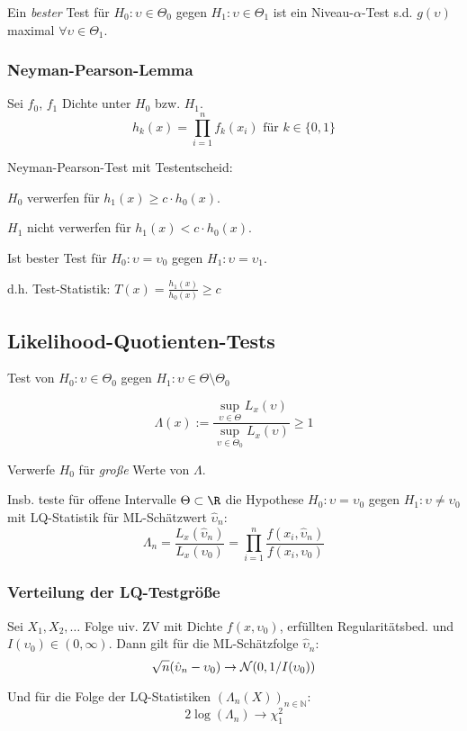 Ein \emph{bester} Test für \(H_0 : \upsilon \in \Theta_0\) gegen \(H_1 : \upsilon \in \Theta_1\) ist ein Niveau-\(\alpha\)-Test s.d. \(g(\upsilon)\) maximal \(\forall \upsilon \in \Theta_1\).

\subsubsection*{Neyman-Pearson-Lemma}

Sei \(f_0\), \(f_1\) Dichte unter \(H_0\) bzw. \(H_1\).
\[ h_k(x) = \prod_{i=1}^n f_k(x_i) \text{ für } k \in \{0,1\} \]

Neyman-Pearson-Test mit Testentscheid:

\(H_0\) verwerfen für \(h_1(x) \geq c \cdot h_0(x)\).

\(H_1\) nicht verwerfen für \(h_1(x) < c \cdot h_0(x)\).

Ist bester Test für \(H_0 : \upsilon = \upsilon_0\) gegen \(H_1 : \upsilon = \upsilon_1\).

d.h. Test-Statistik: \(T(x) = \frac{h_1(x)}{h_0(x)} \geq c\)

\subsection*{Likelihood-Quotienten-Tests}

Test von \(H_0 : \upsilon \in \Theta_0\) gegen \(H_1 : \upsilon \in \Theta \setminus \Theta_0\)

\[ \Lambda(x) := \frac{\sup_{\upsilon \in \Theta} L_x(\upsilon)}{\sup_{\upsilon \in \Theta_0} L_x(\upsilon)} \geq 1 \]

Verwerfe \(H_0\) für \emph{große} Werte von \(\Lambda\).

Insb. teste für offene Intervalle \(\Theta \subset \R\) die Hypothese \(H_0 : \upsilon = \upsilon_0\) gegen \(H_1 : \upsilon \neq \upsilon_0\) mit LQ-Statistik für ML-Schätzwert \(\hat\upsilon_n\):
\[ \Lambda_n = \frac{L_x(\hat\upsilon_n)}{L_x(\upsilon_0)} = \prod_{i=1}^n \frac{f(x_i,\hat\upsilon_n)}{f(x_i,\upsilon_0)} \]

\subsubsection*{Verteilung der LQ-Testgröße}

Sei \(X_1,X_2,\dots\) Folge uiv. ZV mit Dichte \(f(x,\upsilon_0)\), erfüllten Regularitätsbed. und \(I(\upsilon_0) \in (0,\infty)\). Dann gilt für die ML-Schätzfolge \(\hat\upsilon_n\):
\[ \sqrt{n}(\hat\upsilon_n - \upsilon_0) \to \mathcal{N}(0,1/I(\upsilon_0)) \]

Und für die Folge der LQ-Statistiken \((\Lambda_n(X))_{n \in \mathbb{N}}\):
\[ 2 \log(\Lambda_n) \to \chi_1^2 \]
